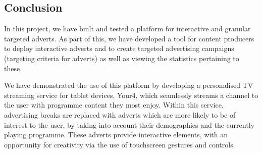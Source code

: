 

\subsection{Conclusion}

In this project, we have built and tested a platform for interactive and granular targeted adverts. As part of this, we have developed a tool for content producers to deploy interactive adverts and to create targeted advertising campaigns (targeting criteria for adverts) as well as viewing the statistics pertaining to these.

We have demonstrated the use of this platform by developing a personalised TV streaming service for tablet devices, Your4, which seamlessly streams a channel to the user with programme content they most enjoy. Within this service, advertising breaks are replaced with adverts which are more likely to be of interest to the user, by taking into account their demographics and the currently playing programme. These adverts provide interactive elements, with an opportunity for creativity via the use of touchscreen gestures and controls.

